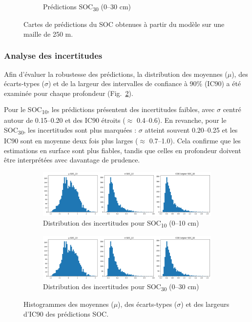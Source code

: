 \documentclass[12pt,a4paper,oneside]{report}
\begin{document}
\begin{figure}[h!]
\begin{subfigure}[b]{0.48\textwidth}
        \caption{Prédictions SOC\textsubscript{30} (0--30 cm)}
    \end{subfigure}
    \caption{Cartes de prédictions du SOC obtenues à partir du modèle sur une maille de 250 m.}
    \label{fig:soc_maps}
\end{figure}

\subsubsection*{Analyse des incertitudes}
Afin d’évaluer la robustesse des prédictions, la distribution des moyennes ($\mu$), des écarts-types ($\sigma$) et de la largeur des intervalles de confiance à 90\% (IC90) a été examinée pour chaque profondeur (Fig.~\ref{fig:uncertainty_hist}).

Pour le SOC\textsubscript{10}, les prédictions présentent des incertitudes faibles, avec $\sigma$ centré autour de 0.15--0.20 et des IC90 étroits ($\approx$ 0.4--0.6).  
En revanche, pour le SOC\textsubscript{30}, les incertitudes sont plus marquées : $\sigma$ atteint souvent 0.20--0.25 et les IC90 sont en moyenne deux fois plus larges ($\approx$ 0.7--1.0).  
Cela confirme que les estimations en surface sont plus fiables, tandis que celles en profondeur doivent être interprétées avec davantage de prudence.

\begin{figure}[h!]
    \centering
    \begin{subfigure}[b]{0.95\textwidth}
        \includegraphics[width=\linewidth]{images/soc10_uncertainty.png}
        \caption{Distribution des incertitudes pour SOC\textsubscript{10} (0--10 cm)}
    \end{subfigure}
    \vskip 0.5cm
    \begin{subfigure}[b]{0.95\textwidth}
        \includegraphics[width=\linewidth]{images/soc30_uncertainty.png}
        \caption{Distribution des incertitudes pour SOC\textsubscript{30} (0--30 cm)}
    \end{subfigure}
    \caption{Histogrammes des moyennes ($\mu$), des écarts-types ($\sigma$) et des largeurs d’IC90 des prédictions SOC.}
    \label{fig:uncertainty_hist}
\end{figure}
\end{document}
